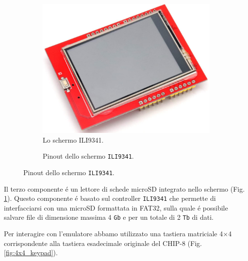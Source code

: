 \documentclass[a4paper]{article}
\begin{document}
\begin{figure}[h!t]
    \begin{subfigure}[b]{0.45\textwidth}
        \begin{center}
            \includegraphics[scale=0.30]{figures/ili9341.png}
        \end{center}
        \caption{Lo schermo ILI9341.}
        \label{fig:ili9341}
    \end{subfigure}
    \hfill
    \begin{subfigure}[b]{0.45\textwidth}
        \begin{center}
            \begin{tikzpicture}[x=0.015cm, y=0.015cm, scale=0.65, transform shape]
                
            \end{tikzpicture}
        \end{center}
        \caption{Pinout dello schermo \texttt{ILI9341}.}
        \label{fig:pinout_ili}
    \end{subfigure}
\end{figure}

Il terzo componente é un lettore di schede microSD integrato nello schermo
(Fig. \ref{fig:ili9341}). Questo componente é basato sul controller
\texttt{ILI9341} che permette di interfacciarsi con una microSD formattata in
FAT32, sulla quale é possibile salvare file di dimensione massima 4 \texttt{Gb}
e per un totale di 2 \texttt{Tb} di dati.

Per interagire con l'emulatore abbamo utilizzato una tastiera matriciale 4$\times$4
corrispondente alla tastiera esadecimale originale del CHIP-8 (Fig. \ref{fig:4x4_keypad}).
\end{document}
